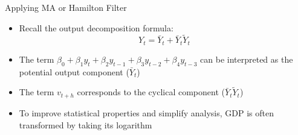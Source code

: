 \documentclass[aspectratio=1610]{beamer}
\begin{document}
\begin{frame}[wide]{Applying MA or Hamilton Filter}
	\begin{itemize}
		\item Recall the output decomposition formula:
		\vspace{4mm}
		\[
		Y_t = \bar{Y}_t + \bar{Y}_t \tilde{Y}_t
		\]
		\item The term \( \beta_0 + \beta_1 y_t + \beta_2 y_{t-1} + \beta_3 y_{t-2} + \beta_4 y_{t-3} \) can be interpreted as the potential output component (\( \bar{Y}_t \))
		\item The term \( v_{t+h} \) corresponds to the cyclical component (\( \bar{Y}_t \tilde{Y}_t \))
		\item To improve statistical properties and simplify analysis, GDP is often transformed by taking its logarithm
	\end{itemize}
\end{frame}
\end{document}

